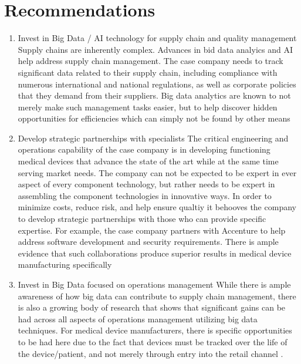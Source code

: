 \section{Recommendations}
\begin{frame}
  \begin{enumerate}
    \item<1-> Invest in Big Data / AI technology for supply chain and quality management
       {\scriptsize{Supply chains are inherently complex. Advances in bid data analyics and AI help address supply chain management. The case company needs to track significant data related to their supply chain, including compliance with numerous international and national regulations, as well as corporate policies that they demand from their suppliers. Big data analytics are known to not merely make such management tasks easier, but to help discover hidden opportunities for efficiencies which can simply not be found by other means \parencite{fossowambaBigDataAnalytics2018} }}

    \item<2-> Develop strategic partnerships with specialists
       {\scriptsize{The critical engineering and operations capability of the case company is in developing functioning medical devices that advance the state of the art while at the same time serving market needs. The company can not be expected to be expert in ever aspect of every component technology, but rather needs to be expert in assembling the component technologies in innovative ways. In order to minimize costs, reduce risk, and help ensure qualtiy it behooves the company to develop strategic partnerships with those who can provide specific expertise. For example, the case company partners with Accenture to help address software development and security requirements. There is ample evidence that such collaborations produce superior results in medical device manufacturing specifically \parencite{aryaPerformanceAnalysisHigh2019}}}

    \item<3-> Invest in Big Data focused on operations management
       {\scriptsize{While there is ample awareness of how big data can contribute to supply chain management, there is also a growing body of research that shows that significant gains can be had across all aspects of operations management utilizing big data techniques. For medical device manufacturers, there is specific opportunities to be had here due to the fact that devices must be tracked over the life of the device/patient, and not merely through entry into the retail channel \parencite{fengHowResearchProduction2018}. }}
  \end{enumerate}



\end{frame}
